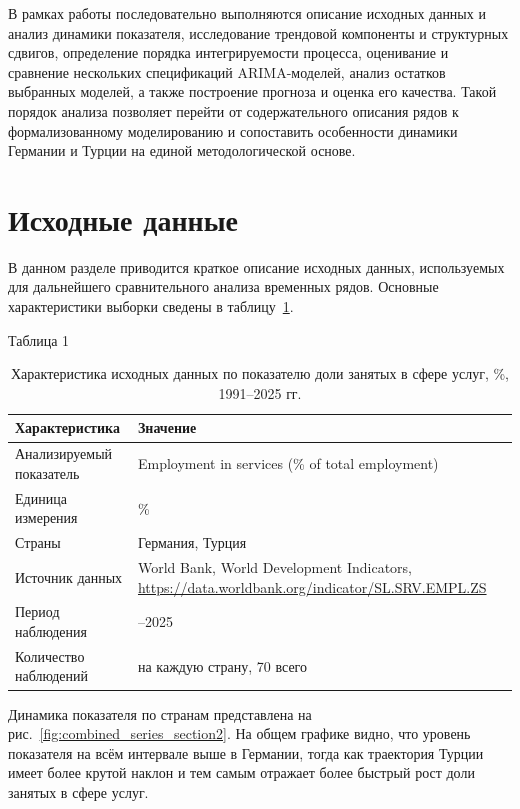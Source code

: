 \documentclass[12pt,a4paper]{article}
\begin{document}
В рамках работы последовательно выполняются описание исходных данных и анализ динамики показателя, исследование трендовой компоненты и структурных сдвигов, определение порядка интегрируемости процесса, оценивание и сравнение нескольких спецификаций ARIMA-моделей, анализ остатков выбранных моделей, а также построение прогноза и оценка его качества. Такой порядок анализа позволяет перейти от содержательного описания рядов к формализованному моделированию и сопоставить особенности динамики Германии и Турции на единой методологической основе.

\section{Исходные данные}

В данном разделе приводится краткое описание исходных данных, используемых для дальнейшего сравнительного анализа временных рядов. Основные характеристики выборки сведены в таблицу~\ref{tab:data_description}.

\begin{table}[H]
\centering
\begin{flushright}
\small Таблица 1
\end{flushright}
\caption{Характеристика исходных данных по показателю доли занятых в сфере услуг, \%, 1991--2025 гг.}
\label{tab:data_description}
\begin{tabularx}{\textwidth}{>{\raggedright\arraybackslash}p{} >{\raggedright\arraybackslash}X}
\toprule
\textbf{Характеристика} & \textbf{Значение} \\
\midrule
Анализируемый показатель & Employment in services (\% of total employment) \\
Единица измерения & \% \\
Страны & Германия, Турция \\
Источник данных & World Bank, World Development Indicators, \url{https://data.worldbank.org/indicator/SL.SRV.EMPL.ZS} \\
Период наблюдения & 1991--2025 \\
Количество наблюдений & 35 на каждую страну, 70 всего \\
\bottomrule
\end{tabularx}
\end{table}

Динамика показателя по странам представлена на рис.~\ref{fig:combined_series_section2}. На общем графике видно, что уровень показателя на всём интервале выше в Германии, тогда как траектория Турции имеет более крутой наклон и тем самым отражает более быстрый рост доли занятых в сфере услуг.
\end{document}
